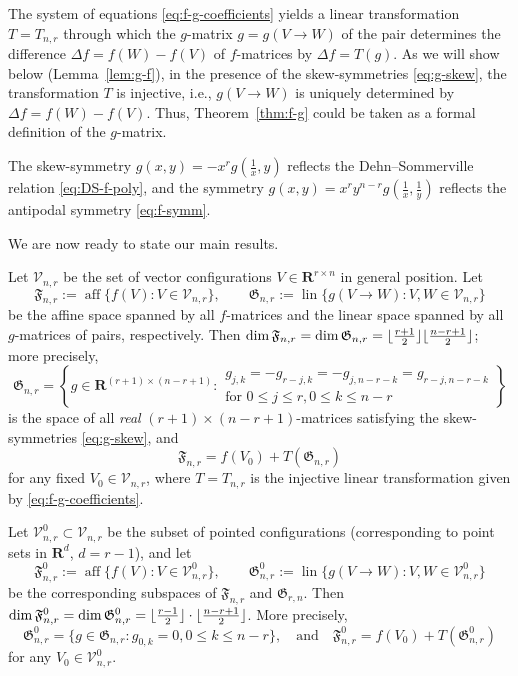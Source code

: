 \documentclass[a4paper,USenglish,cleveref, autoref, thm-restate,nolineno]{socg-lipics-v2021}
\DeclareMathOperator{\aff}{aff}
\DeclareMathOperator{\lin}{lin}
\newcommand{\fspace}{\mathfrak{F}}
\newcommand{\gspace}{\mathfrak{G}}
\renewcommand{\leq}{\leqslant}
\newcommand{\R}{\mathbf{R}}
\DeclarePairedDelimiter\floor{\lfloor}{\rfloor}
\begin{document}
\begin{remark} 
\label{rem:g-f+DS-g}
The system of equations \eqref{eq:f-g-coefficients} yields a linear transformation $T=T_{n,r}$ through which 
the $g$-matrix $g=g(V\to W)$ of the pair determines the difference $\Delta f=f(W)-f(V)$ of $f$-matrices by $\Delta f=T(g)$. As we will show below (Lemma~\ref{lem:g-f}), in the presence of the skew-symmetries \eqref{eq:g-skew}, the transformation $T$ is injective, i.e., $g(V\to W)$ is uniquely determined by $\Delta f=f(W)-f(V)$. Thus, Theorem~\ref{thm:f-g} could be taken as a formal definition of the $g$-matrix. 
\end{remark}
\begin{remark}
The skew-symmetry $g(x,y)=-x^r g(\frac{1}{x},y)$ reflects the Dehn--Sommerville relation \eqref{eq:DS-f-poly}, and 
the symmetry $g(x,y)=x^ry^{n-r}g(\frac{1}{x},\frac{1}{y})$ reflects the antipodal symmetry \eqref{eq:f-symm}.
\end{remark}

We are now ready to state our main results.

\begin{theorem}
\label{thm:f-space-g-space} 
Let $\mathcal{V}_{n,r}$ be the set of vector configurations $V\in \R^{r\times n}$ in general position. Let 
\[
\fspace_{n,r}:=\aff\{f(V)\colon V\in \mathcal{V}_{n,r}\}, \qquad \gspace_{n,r}:=\lin\{g(V \to W) \colon V,W \in \mathcal{V}_{n,r}\} 
\]
be the affine space spanned by all $f$-matrices and the linear space spanned by all $g$-matrices of pairs, respectively.
Then $\dim \fspace_{n,r}=\dim \gspace_{n,r}=\floor{\frac{r+1}{2}}\floor{\frac{n-r+1}{2}}$; more precisely, 
\begin{equation}
\label{eq:g-space}
\gspace_{n,r}=\left\{ g \in \R^{(r+1)\times (n-r+1)} \colon \begin{array}{c}g_{j,k}=-g_{r-j,k}=-g_{j,n-r-k}=g_{r-j,n-r-k}\\ \textrm{for } 0\leq j\leq r, 0\leq k\leq n-r\end{array}
\right\}
\end{equation}
is the space of all \emph{real} $(r+1)\times (n-r+1)$-matrices satisfying the skew-symmetries \eqref{eq:g-skew}, and 
\[
\fspace_{n,r}=f(V_0)+T(\gspace_{n,r})
\]
for any fixed $V_0 \in \mathcal{V}_{n,r}$, where $T=T_{n,r}$ is the injective linear transformation given by \eqref{eq:f-g-coefficients}.
\end{theorem}

\begin{theorem}
\label{thm:f-space-g-space-pointed}
Let $\mathcal{V}^0_{n,r} \subset \mathcal{V}_{n,r}$ be the subset of pointed configurations (corresponding to point sets in $\R^d$, $d=r-1$), and let  
\[
\fspace^0_{n,r}:=\aff\{f(V)\colon V\in \mathcal{V}^0_{n,r}\}, \qquad \gspace^0_{n,r}:=\lin\{g(V \to W) \colon V,W \in \mathcal{V}^0_{n,r}\}
\]
be the corresponding subspaces of $\fspace_{n,r}$ and $\gspace_{r,n}$. Then $\dim \fspace^0_{n,r}=\dim \gspace^0_{n,r}=\floor{\frac{r-1}{2}}\cdot \floor{\frac{n-r+1}{2}}$. More precisely, 
\[
\gspace^0_{n,r}=\{g\in \gspace_{n,r}\colon g_{0,k}=0, 0\leq k \leq n-r\},\quad \textrm{and}\quad \fspace^0_{n,r}=f(V_0)+T(\gspace^0_{n,r})
\]
for any $V_0 \in \mathcal{V}^0_{n,r}$.
\end{theorem}
\end{document}
